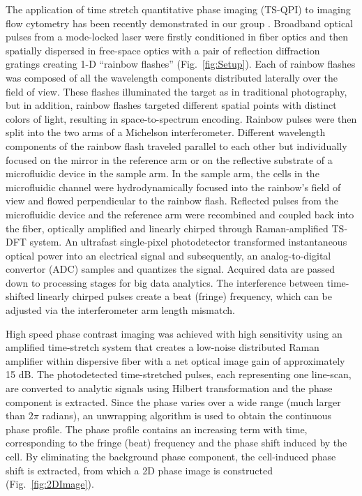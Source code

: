 \documentclass[aps,pra,reprint,superscriptaddress]{revtex4-1}
\begin{document}
The application of time stretch quantitative phase imaging (TS-QPI) to imaging flow cytometry has been recently demonstrated in our group \cite{mahjoubfar2013label}. Broadband optical pulses from a mode-locked laser were firstly conditioned in fiber optics and then spatially dispersed in free-space optics with a pair of reflection diffraction gratings creating 1-D ``rainbow flashes'' (Fig.~\ref{fig:Setup}). Each of rainbow flashes was composed of all the wavelength components distributed laterally over the field of view. These flashes illuminated the target as in traditional photography, but in addition, rainbow flashes targeted different spatial points with distinct colors of light, resulting in space-to-spectrum encoding. Rainbow pulses were then split into the two arms of a Michelson interferometer. Different wavelength components of the rainbow flash traveled parallel to each other but individually focused on the mirror in the reference arm or on the reflective substrate of a microfluidic device in the sample arm. In the sample arm, the cells in the microfluidic channel were hydrodynamically focused \cite{knight1998hydrodynamic,lee2006hydrodynamic} into the rainbow's field of view and flowed perpendicular to the rainbow flash. Reflected pulses from the microfluidic device and the reference arm were recombined and coupled back into the fiber, optically amplified and linearly chirped through Raman-amplified TS-DFT system. An ultrafast single-pixel photodetector  transformed instantaneous optical power into an electrical signal and subsequently, an analog-to-digital convertor (ADC) samples and quantizes the signal. Acquired data are passed down to processing stages for big data analytics. The interference between time-shifted linearly chirped pulses create a beat (fringe) frequency, which can be adjusted via the interferometer arm length mismatch.

High speed phase contrast imaging was achieved with high sensitivity using an amplified time-stretch system that creates a low-noise distributed Raman amplifier within dispersive fiber with a net optical image gain of approximately 15 dB. The photodetected time-stretched pulses, each representing one line-scan, are converted to analytic signals using Hilbert transformation \cite{king2009hilbert} and the phase component is extracted. Since the phase varies over a wide range (much larger than $2 \pi$ radians), an unwrapping algorithm is used to obtain the continuous phase profile. The phase profile contains an increasing term with time, corresponding to the fringe (beat) frequency and the phase shift induced by the cell. By eliminating the background phase component, the cell-induced phase shift is extracted, from which a 2D phase image is constructed (Fig.~\ref{fig:2DImage}).
\end{document}
